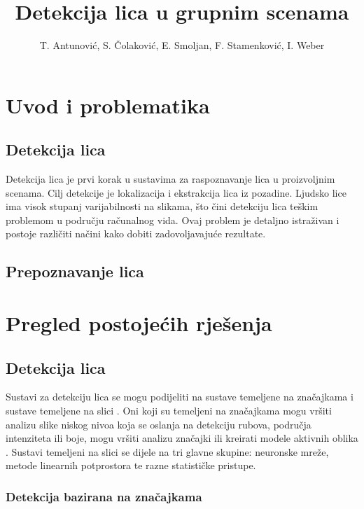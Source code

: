 \documentclass[times, utf8, seminar, numeric]{fer}
\title{Detekcija lica u grupnim scenama}
\author{T. Antunović, S. Čolaković, E. Smoljan, F. Stamenković, I. Weber}
\begin{document}
\maketitle

\tableofcontents

\chapter{Uvod i problematika}

\section{Detekcija lica}

Detekcija lica je prvi korak u sustavima za raspoznavanje lica u proizvoljnim scenama. Cilj detekcije je lokalizacija i ekstrakcija lica iz pozadine. Ljudsko lice ima visok stupanj varijabilnosti na slikama, što čini detekciju lica teškim problemom u području računalnog vida. Ovaj problem je detaljno istraživan i postoje različiti načini kako dobiti zadovoljavajuće rezultate.

\section{Prepoznavanje lica}

\chapter{Pregled postojećih rješenja}

\section{Detekcija lica}

Sustavi za detekciju lica se mogu podijeliti na sustave temeljene na značajkama  i sustave temeljene na slici  \cite{CVIU2001:Hjelmas}. Oni koji su temeljeni na značajkama mogu vršiti analizu slike niskog nivoa koja se oslanja na detekciju rubova, područja intenziteta ili boje, mogu vršiti analizu značajki ili kreirati modele aktivnih oblika . Sustavi temeljeni na slici se dijele na tri glavne skupine: neuronske mreže, metode linearnih potprostora te razne statističke pristupe.

\subsection{Detekcija bazirana na značajkama}
\end{document}
